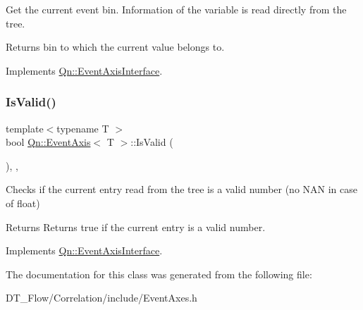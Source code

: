 Get the current event bin. Information of the variable is read directly from the tree. 

\begin{DoxyReturn}{Returns}
bin to which the current value belongs to. 
\end{DoxyReturn}


Implements \mbox{\hyperlink{classQn_1_1EventAxisInterface}{Qn\+::\+Event\+Axis\+Interface}}.

\mbox{\label{classQn_1_1EventAxis_a503c69f641f36b6717ffc167b53abd56}} 
\subsubsection{\texorpdfstring{Is\+Valid()}{IsValid()}}
{\footnotesize\ttfamily template$<$typename T $>$ \\
bool \mbox{\hyperlink{classQn_1_1EventAxis}{Qn\+::\+Event\+Axis}}$<$ T $>$\+::Is\+Valid (\begin{DoxyParamCaption}{ }\end{DoxyParamCaption})\hspace{0.3cm}{\ttfamily [inline]}, {\ttfamily [override]}, {\ttfamily [virtual]}}

Checks if the current entry read from the tree is a valid number (no N\+AN in case of float) \begin{DoxyReturn}{Returns}
Returns true if the current entry is a valid number. 
\end{DoxyReturn}


Implements \mbox{\hyperlink{classQn_1_1EventAxisInterface}{Qn\+::\+Event\+Axis\+Interface}}.



The documentation for this class was generated from the following file\+:\begin{DoxyCompactItemize}
\item 
D\+T\+\_\+\+Flow/\+Correlation/include/Event\+Axes.\+h\end{DoxyCompactItemize}

